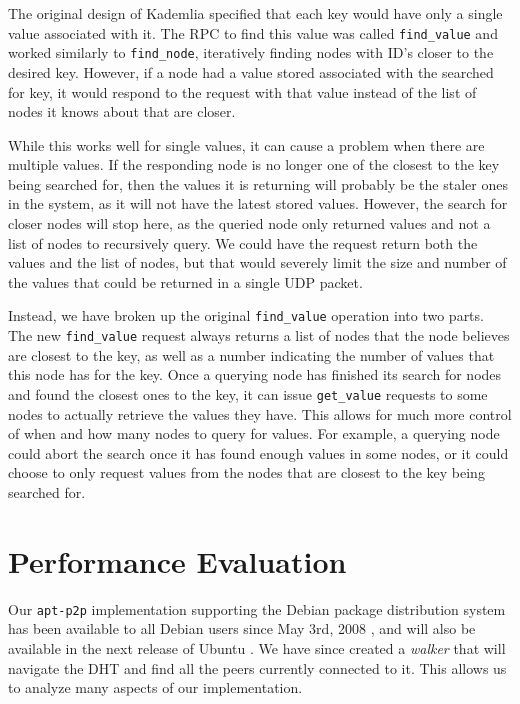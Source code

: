 \documentclass[conference]{IEEEtran}
\begin{document}
The original design of Kademlia specified that each key would have
only a single value associated with it. The RPC to find this value
was called \texttt{find\_value} and worked similarly to
\texttt{find\_node}, iteratively finding nodes with ID's closer to
the desired key. However, if a node had a value stored associated
with the searched for key, it would respond to the request with that
value instead of the list of nodes it knows about that are closer.

While this works well for single values, it can cause a problem when
there are multiple values. If the responding node is no longer one
of the closest to the key being searched for, then the values it is
returning will probably be the staler ones in the system, as it
will not have the latest stored values. However, the search for
closer nodes will stop here, as the queried node only returned
values and not a list of nodes to recursively query. We could have
the request return both the values and the list of nodes, but that
would severely limit the size and number of the values that could be
returned in a single UDP packet.

Instead, we have broken up the original \texttt{find\_value}
operation into two parts. The new \texttt{find\_value} request
always returns a list of nodes that the node believes are closest to
the key, as well as a number indicating the number of values that
this node has for the key. Once a querying node has finished its
search for nodes and found the closest ones to the key, it can issue
\texttt{get\_value} requests to some nodes to actually retrieve the
values they have. This allows for much more control of when and how
many nodes to query for values. For example, a querying node could
abort the search once it has found enough values in some nodes, or
it could choose to only request values from the nodes that are
closest to the key being searched for.




\section{Performance Evaluation}
\label{analysis}

Our \texttt{apt-p2p} implementation supporting the Debian package
distribution system has been available to all Debian users since May
3rd, 2008 \cite{apt-p2p-debian}, and will also be available in the
next release of Ubuntu \cite{apt-p2p-ubuntu}. We have since created
a \emph{walker} that will navigate the DHT and find all the peers
currently connected to it. This allows us to analyze many aspects of
our implementation.
\end{document}
